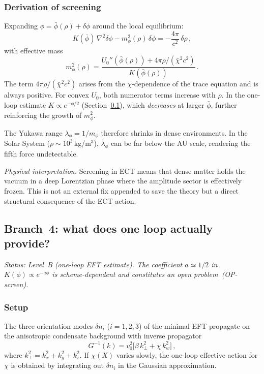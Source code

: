 \documentclass[11pt,a4paper]{article}
\numberwithin{equation}{section}
\begin{document}
\subsubsection{Derivation of screening}
\label{app:lof:screening_derivation}

Expanding $\phi = \bar\phi(\rho) + \delta\phi$ around the
local equilibrium:
\begin{equation}
K(\bar\phi)\,\nabla^2\delta\phi
- m_\phi^2(\rho)\,\delta\phi
= -\frac{4\pi}{c^2}\,\delta\rho\,,
\end{equation}
with effective mass
\begin{equation}
m_\phi^2(\rho)
= \frac{U_0''(\bar\phi(\rho))
        + 4\pi\rho/(\bar\chi^2 c^2)}
       {K(\bar\phi(\rho))}\,.
\label{eq:app_mphi}
\end{equation}
The term $4\pi\rho/(\bar\chi^2 c^2)$ arises from the
$\chi$-dependence of the trace equation and is always positive.
For convex $U_0$, both numerator terms increase with $\rho$.
In the one-loop estimate $K \propto e^{-\phi/2}$
(Section~\ref{app:lof:oneloop_calc}), which \emph{decreases} at
larger $\bar\phi$, further reinforcing the growth of $m_\phi^2$.

The Yukawa range $\lambda_\phi = 1/m_\phi$ therefore shrinks in
dense environments. In the Solar System
($\rho \sim 10^3\,$kg/m$^3$), $\lambda_\phi$ can be far below
the AU scale, rendering the fifth force undetectable.

\emph{Physical interpretation.} Screening in ECT means that dense
matter holds the vacuum in a deep Lorentzian phase where the
amplitude sector is effectively frozen. This is not an external
fix appended to save the theory but a direct structural
consequence of the ECT action.


\subsection{Branch~4: what does one loop actually provide?}
\label{app:lof:oneloop_calc}

\textit{Status: Level~B (one-loop EFT estimate).
The coefficient $a\simeq 1/2$ in $K(\phi)\propto e^{-a\phi}$
is scheme-dependent and constitutes an open problem~(OP-screen).}

\subsubsection{Setup}

The three orientation modes $\delta n_i$ ($i = 1,2,3$) of the minimal EFT propagate
on the anisotropic condensate background with inverse propagator
\begin{equation}
G^{-1}(k)
= v_0^2\bigl[\beta\,k_\perp^2 + \chi\,k_w^2\bigr]\,,
\end{equation}
where $k_\perp^2 = k_x^2 + k_y^2 + k_z^2$. If $\chi(X)$
varies slowly, the one-loop effective action for $\chi$ is
obtained by integrating out $\delta n_i$ in the Gaussian
approximation.
\end{document}

